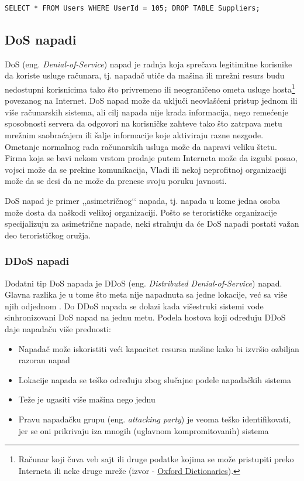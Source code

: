 \documentclass[a4paper]{article}
\theoremstyle{break}
\begin{document}
{\begin{lstlisting}[frame=single]
SELECT * FROM Users WHERE UserId = 105; DROP TABLE Suppliers; 
\end{lstlisting}

\subsection{DoS napadi}
\label{subsec:DoS}

DoS (eng. {\em Denial-of-Service}) napad je radnja koja sprečava legitimitne korisnike da koriste usluge računara, tj. napadač utiče da mašina ili mrežni resurs  budu nedostupni korisnicima tako što privremeno ili neograničeno ometa usluge hosta\footnote{Računar koji čuva veb sajt ili druge podatke kojima se može pristupiti preko Interneta ili neke druge mreže (izvor - \href{https://en.oxforddictionaries.com/definition/host}{Oxford Dictionaries}).} povezanog na Internet. DoS napad može da uključi neovlašćeni pristup jednom ili više računarskih sistema, ali cilj napada nije krađa informacija, nego remećenje sposobnosti servera da odgovori na korisničke zahteve tako što zatrpava metu mrežnim saobraćajem ili šalje informacije koje aktiviraju razne nezgode. Ometanje normalnog rada računarskih usluga može da napravi veliku štetu. Firma koja se bavi nekom vrstom prodaje putem Interneta može da izgubi posao, vojsci može da se prekine komunikacija, Vladi ili nekoj neprofitnoj organizaciji može da se desi da ne može da prenese svoju poruku javnosti.

DoS napad je primer ,,asimetričnog‘‘ napada, tj. napada u kome jedna osoba može dosta da naškodi velikoj organizaciji. Pošto se terorističke organizacije specijalizuju za asimetrične napade, neki strahuju da će DoS napadi postati važan deo terorističkog oružja.

\subsubsection{DDoS napadi}
\label{subsubsec:DDoS}

Dodatni tip DoS napada je DDoS (eng. {\em Distributed Denial-of-Service}) napad. Glavna razlika je u tome što meta nije napadnuta sa jedne lokacije, već sa više njih odjednom \cite{ddos}. Do DDoS napada se dolazi kada višestruki sistemi vode sinhronizovani DoS napad na jednu metu. Podela hostova koji određuju DDoS daje napadaču više prednosti:
\begin{itemize}
\item Napadač može iskoristiti veći kapacitet resursa mašine kako bi izvršio ozbiljan razoran napad
\item Lokacije napada se teško određuju zbog slučajne podele napadačkih sistema
\item Teže je ugasiti više mašina nego jednu
\item Pravu napadačku grupu (eng. {\em attacking party}) je veoma teško identifikovati, jer se oni prikrivaju iza mnogih (uglavnom kompromitovanih) sistema
\end{itemize}

}
\end{document}
